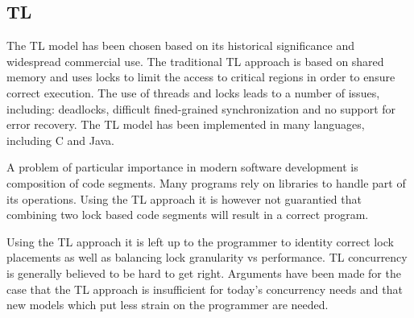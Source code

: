 \subsection{\acl{TL}}
\label{subsec:tl}
The \ac{TL} model has been chosen based on its historical significance and widespread commercial use\cite[p. 58]{sutter2005software}. The traditional \ac{TL} approach is based on shared memory and uses locks to limit the access to critical regions in order to ensure correct execution\cite[p. 1]{saha2006mcrt}. The use of threads and locks leads to a number of issues, including: deadlocks, difficult fined-grained synchronization and no support for error recovery\cite[p. 187]{saha2006mcrt}. The \ac{TL} model has been implemented in many languages, including C and Java. 

A problem of particular importance in modern software development is composition of code segments. Many programs rely on libraries to handle part of its operations. Using the \ac{TL} approach it is however not guarantied that combining two lock based code segments will result in a correct program\cite[p. 56]{sutter2005software}.

Using the \ac{TL} approach it is left up to the programmer to identity correct lock placements as well as balancing lock granularity vs performance\cite[p. 49]{harris2005composable}. \ac{TL} concurrency is generally believed to be hard to get right\cite[p. 92]{herlihy2003software}. Arguments have been made for the case that the \ac{TL} approach is insufficient for today's concurrency needs and that new models which put less strain on the programmer are needed\cite[p. 3]{jones2007beautiful}\cite[p. 48]{harris2005composable}.


